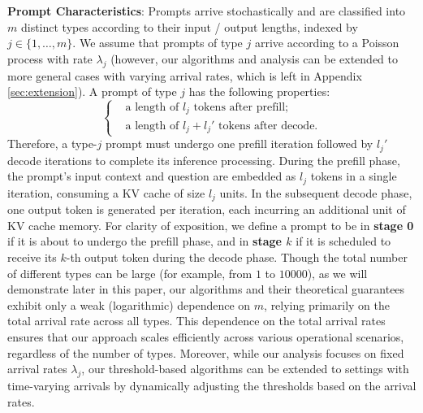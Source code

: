 
\textbf{Prompt Characteristics}: Prompts arrive stochastically and are classified into \( m \) distinct types according to their input / output lengths, indexed by \( j \in \{1, \dots, m\} \). We assume that prompts of type \( j \) arrive according to a Poisson process with rate \( \lambda_j \) (however, our algorithms and analysis can be extended to more general cases with varying arrival rates, which is left in Appendix \ref{sec:extension}). A prompt of type \( j \) has the following properties:
\begin{equation*}
    \left\{
    \begin{aligned}
        &\text{a length of } l_j \text{ tokens after prefill;}\\
        &\text{a length of } l_j + l_j' \text{ tokens after decode.}
    \end{aligned}
    \right.
\end{equation*}
Therefore, a type-$j$ prompt must undergo one prefill iteration followed by $l_j'$ decode iterations to complete its inference processing. During the prefill phase, the prompt’s input context and question are embedded as $l_j$ tokens in a single iteration, consuming a KV cache of size $l_j$ units. In the subsequent decode phase, one output token is generated per iteration, each incurring an additional unit of KV cache memory. For clarity of exposition, we define a prompt to be in \textbf{stage 0} if it is about to undergo the prefill phase, and in \textbf{stage $k$} if it is scheduled to receive its $k$-th output token during the decode phase. Though the total number of different types can be large (for example, from $1$ to $10000$), as we will demonstrate later in this paper, our algorithms and their theoretical guarantees exhibit only a weak (logarithmic) dependence on \( m \), relying primarily on the total arrival rate across all types. This dependence on the total arrival rates ensures that our approach scales efficiently across various operational scenarios, regardless of the number of types. Moreover, while our analysis focuses on fixed arrival rates \( \lambda_j \), our threshold-based algorithms can be extended to settings with time-varying arrivals by dynamically adjusting the thresholds based on the arrival rates.


